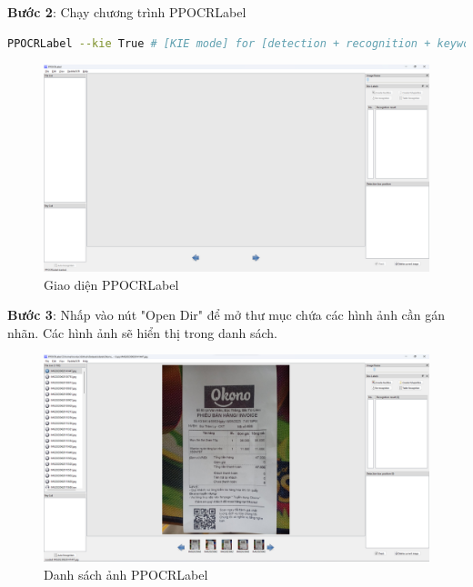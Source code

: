 \textbf{Bước 2}: Chạy chương trình PPOCRLabel
\begin{lstlisting}[language=bash]
    PPOCRLabel --kie True # [KIE mode] for [detection + recognition + keyword extraction] labeling
\end{lstlisting}
\begin{figure}[h]
    \includegraphics[scale=0.25]{images/UI-ppocr.png}
    \centering
    \caption{Giao diện PPOCRLabel}
\end{figure}

\textbf{Bước 3}: Nhấp vào nút "Open Dir" để mở thư mục chứa các hình ảnh cần gán nhãn. Các hình ảnh sẽ hiển thị trong danh sách.
\begin{figure}[h]
    \includegraphics[scale=0.26]{images/UI-ppocr-image.png}
    \centering
    \caption{Danh sách ảnh PPOCRLabel}
\end{figure}

